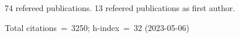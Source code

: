 74 refereed publications. 13 refeered publications as first author.

Total citations~=~3250; h-index~=~32 (2023-05-06)